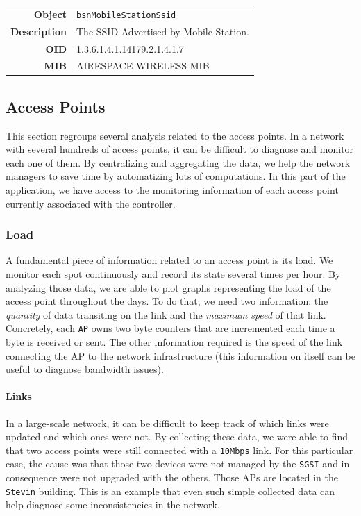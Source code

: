 \begin{tabular}{|r l|}
\hline
\textbf{Object} & \texttt{bsnMobileStationSsid} \\
\textbf{Description} & \parbox{11cm}{The SSID Advertised by Mobile Station.} \\
\textbf{OID} & 1.3.6.1.4.1.14179.2.1.4.1.7 \\
\textbf{MIB} & AIRESPACE-WIRELESS-MIB \\
\hline
\end{tabular}

\subsection{Access Points}
This section regroups several analysis related to the access points. In a network with several hundreds of access points, it can be difficult to diagnose and monitor each one of them. By centralizing and aggregating the data, we help the network managers to save time by automatizing lots of computations. In this part of the application, we have access to the monitoring information of each access point currently associated with the controller.

\subsubsection*{Load}
A fundamental piece of information related to an access point is its load. We monitor each spot continuously and record its state several times per hour. By analyzing those data, we are able to plot graphs representing the load of the access point throughout the days. To do that, we need two information: the \textit{quantity} of data transiting on the link and the \textit{maximum speed} of that link. Concretely, each \texttt{AP} owns two byte counters that are incremented each time a byte is received or sent. The other information required is the speed of the link connecting the AP to the network infrastructure (this information on itself can be useful to diagnose bandwidth issues).

\paragraph*{Links} In a large-scale network, it can be difficult to keep track of which links were updated and which ones were not. By collecting these data, we were able to find that two access points were still connected with a \texttt{10Mbps} link. For this particular case, the cause was that those two devices were not managed by the \texttt{SGSI} and in consequence were not upgraded with the others. Those APs are located in the \texttt{Stevin} building.
This is an example that even such simple collected data can help diagnose some inconsistencies in the network.


